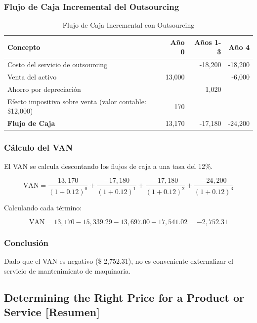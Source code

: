 \documentclass{templateNote}
\begin{document}
\subsubsection*{Flujo de Caja Incremental del Outsourcing}

\begin{table}[H]
    \centering
        \begin{tabular}{lrrr}
            \toprule
            \textbf{Concepto} & \textbf{Año 0} & \textbf{Años 1-3} & \textbf{Año 4} \\
            \midrule
            Costo del servicio de outsourcing &  & -18,200 & -18,200 \\
            Venta del activo & 13,000 &  & -6,000 \\
            Ahorro por depreciación &  & 1,020 &  \\
            Efecto impositivo sobre venta (valor contable: \$12,000) & 170 &  &  \\
            \midrule
            \textbf{Flujo de Caja} & 13,170 & -17,180 & -24,200 \\
            \bottomrule
        \end{tabular}
    \caption{Flujo de Caja Incremental con Outsourcing}
\end{table}

\subsubsection*{Cálculo del VAN}

El VAN se calcula descontando los flujos de caja a una tasa del 12\%.

\[
\text{VAN} = \frac{13,170}{(1 + 0.12)^0} + \frac{-17,180}{(1 + 0.12)^1} + \frac{-17,180}{(1 + 0.12)^2} + \frac{-24,200}{(1 + 0.12)^3}
\]

Calculando cada término:

\[
\text{VAN} = 13,170 - 15,339.29 - 13,697.00 - 17,541.02 = -2,752.31
\]

\subsubsection*{Conclusión}

Dado que el VAN es negativo (\$-2,752.31), no es conveniente externalizar el servicio de mantenimiento de maquinaria.

\subsection{Determining the Right Price for a Product or Service [Resumen]}
\end{document}
